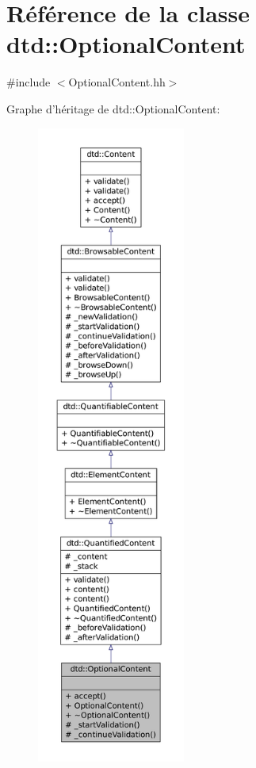 \hypertarget{classdtd_1_1_optional_content}{
\section{Référence de la classe dtd::OptionalContent}
\label{classdtd_1_1_optional_content}
}


{\ttfamily \#include $<$OptionalContent.hh$>$}



Graphe d'héritage de dtd::OptionalContent:\nopagebreak
\begin{figure}[H]
\begin{center}
\leavevmode
\includegraphics[height=600pt]{classdtd_1_1_optional_content__inherit__graph}
\end{center}
\end{figure}


